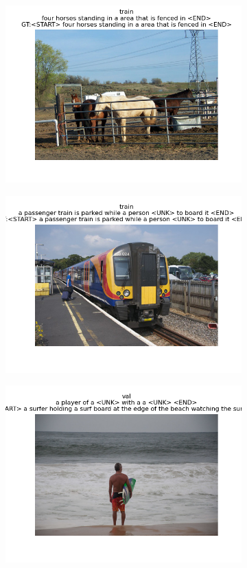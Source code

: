\documentclass{article}
\begin{document}
\begin{figure}[htbp]
    \begin{subfigure}{.5\textwidth}
        \centering
        \includegraphics[width=.88\linewidth]{Figure_1.png}  
    \end{subfigure}
    \begin{subfigure}{.5\textwidth}
      \centering
      \includegraphics[width=.88\linewidth]{Figure_2.png}
    \end{subfigure}
    \begin{subfigure}{.5\textwidth}
        \centering
        \includegraphics[width=.88\linewidth]{Figure_3.png}  

\end{subfigure}
\end{figure}
\end{document}
